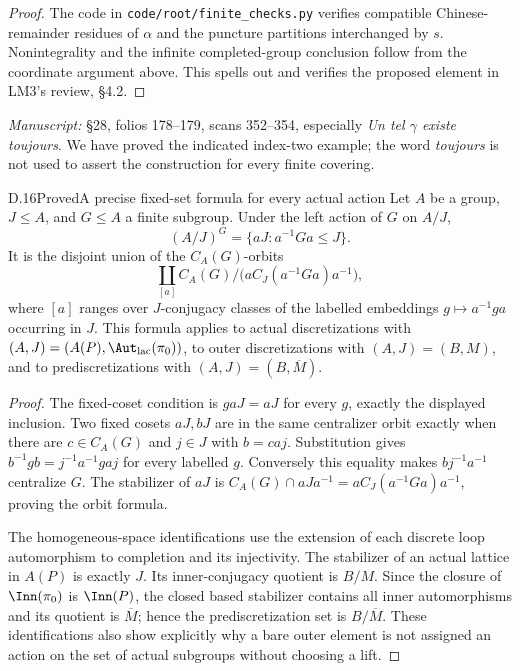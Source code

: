 \begin{proof}
The code in \texttt{code/root/finite\_checks.py} verifies compatible Chinese-remainder residues of $\alpha$ and the puncture partitions interchanged by $s$. Nonintegrality and the infinite completed-group conclusion follow from the coordinate argument above. This spells out and verifies the proposed element in LM3's review, \S4.2.
\end{proof}
\noindent\emph{Manuscript:} \S28, folios 178--179, scans 352--354, especially \emph{Un tel $\gamma$ existe toujours}. We have proved the indicated index-two example; the word \emph{toujours} is not used to assert the construction for every finite covering.


\begin{claim}{D.16}{Proved}{A precise fixed-set formula for every actual action}
Let $A$ be a group, $J\leq A$, and $G\leq A$ a finite subgroup. Under the left action of $G$ on $A/J$,
\[
 (A/J)^G=\{aJ:a^{-1}Ga\leq J\}.
\]
It is the disjoint union of the $C_A(G)$-orbits
\[
 \coprod_{[a]} C_A(G)\big/\bigl(aC_J(a^{-1}Ga)a^{-1}\bigr),
\]
where $[a]$ ranges over $J$-conjugacy classes of the labelled embeddings $g\mapsto a^{-1}ga$ occurring in $J$. This formula applies to actual discretizations with $(A,J)=(A(P),\Aut_{\rm lac}(\pi_0))$, to outer discretizations with $(A,J)=(B,M)$, and to prediscretizations with $(A,J)=(B,\overline M)$.
\end{claim}
\begin{proof}
The fixed-coset condition is $gaJ=aJ$ for every $g$, exactly the displayed inclusion. Two fixed cosets $aJ,bJ$ are in the same centralizer orbit exactly when there are $c\in C_A(G)$ and $j\in J$ with $b=caj$. Substitution gives $b^{-1}gb=j^{-1}a^{-1}gaj$ for every labelled $g$. Conversely this equality makes $b j^{-1}a^{-1}$ centralize $G$. The stabilizer of $aJ$ is $C_A(G)\cap aJa^{-1}=aC_J(a^{-1}Ga)a^{-1}$, proving the orbit formula.

The homogeneous-space identifications use the extension of each discrete loop automorphism to completion and its injectivity. The stabilizer of an actual lattice in $A(P)$ is exactly $J$. Its inner-conjugacy quotient is $B/M$. Since the closure of $\Inn(\pi_0)$ is $\Inn(P)$, the closed based stabilizer contains all inner automorphisms and its quotient is $\overline M$; hence the prediscretization set is $B/\overline M$. These identifications also show explicitly why a bare outer element is not assigned an action on the set of actual subgroups without choosing a lift.
\end{proof}

